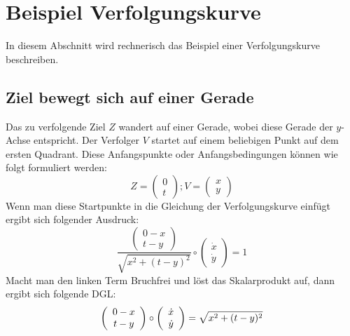 %
%
%
\section{Beispiel Verfolgungskurve
\label{lambertw:section:teil4}}
In diesem Abschnitt wird rechnerisch das Beispiel einer Verfolgungskurve beschreiben.

\subsection{Ziel bewegt sich auf einer Gerade
\label{lambertw:subsection:malorum}}
Das zu verfolgende Ziel \(Z\) wandert auf einer Gerade, wobei diese Gerade der \(y\)-Achse entspricht. Der Verfolger \(V\) startet auf einem beliebigen Punkt auf dem ersten Quadrant. Diese Anfangspunkte oder Anfangsbedingungen können wie folgt formuliert werden:
\begin{equation}
	Z
	=
	\left( \begin{array}{c} 0 \\ t \end{array} \right)
	;
	V
	=
	\left( \begin{array}{c} x \\ y \end{array} \right)
	\label{lambertw:equation2}
\end{equation}
Wenn man diese Startpunkte in die Gleichung der Verfolgungskurve einfügt ergibt sich folgender Ausdruck:
\begin{equation}
	\frac{\left( \begin{array}{c} 0-x \\ t-y \end{array} \right)}{\sqrt{x^2 + (t-y)^2}}
	\circ
	\left(\begin{array}{c} \dot{x} \\ \dot{y} \end{array}\right)
	=
	1
	\label{lambertw:equation3}
\end{equation}
Macht man den linken Term Bruchfrei und löst das Skalarprodukt auf, dann ergibt sich folgende DGL:
\[
	\left( \begin{array}{c} 0-x \\ t-y \end{array} \right)
	\circ
	\left(\begin{array}{c} \dot{x} \\ \dot{y} \end{array}\right)
	= \sqrt{x^2 + (t-y)^2}\\
\]
